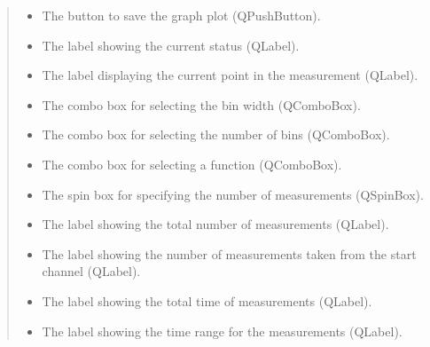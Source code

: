 \documentclass[letterpaper,10pt,english]{sphinxmanual}
\begin{document}
\begin{fulllineitems}
\begin{quote}
\begin{description}
\begin{itemize}
\item {} 
\sphinxAtStartPar
{} \textendash{} The button to save the graph plot (QPushButton).

\item {} 
\sphinxAtStartPar
{} \textendash{} The label showing the current status (QLabel).

\item {} 
\sphinxAtStartPar
{} \textendash{} The label displaying the current point in the measurement (QLabel).

\item {} 
\sphinxAtStartPar
{} \textendash{} The combo box for selecting the bin width (QComboBox).

\item {} 
\sphinxAtStartPar
{} \textendash{} The combo box for selecting the number of bins (QComboBox).

\item {} 
\sphinxAtStartPar
{} \textendash{} The combo box for selecting a function (QComboBox).

\item {} 
\sphinxAtStartPar
{} \textendash{} The spin box for specifying the number of measurements (QSpinBox).

\item {} 
\sphinxAtStartPar
{} \textendash{} The label showing the total number of measurements (QLabel).

\item {} 
\sphinxAtStartPar
{} \textendash{} The label showing the number of measurements taken from the start channel (QLabel).

\item {} 
\sphinxAtStartPar
{} \textendash{} The label showing the total time of measurements (QLabel).

\item {} 
\sphinxAtStartPar
{} \textendash{} The label showing the time range for the measurements (QLabel).


\end{itemize}
\end{description}
\end{quote}
\end{fulllineitems}
\end{document}
